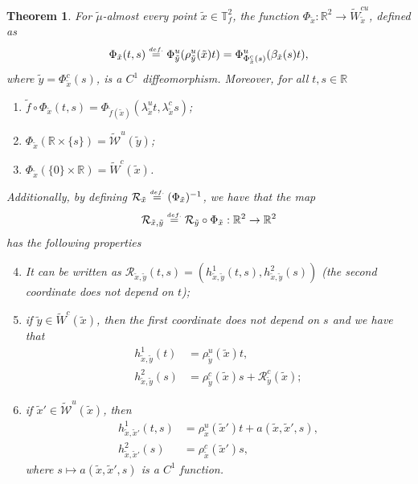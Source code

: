 \documentclass[a4paper,11pt,reqno]{amsart}
\def\tW{\widetilde W}
\newcommand{\R}{{\mathbb R}}
\newcommand{\cW}{{\mathcal W}}
\newcommand{\eqdef}{\stackrel{\scriptscriptstyle\textrm def.}{=}}
\newcommand{\tix}{\tilde{x}}
\newcommand{\w}{\widetilde{\cW}}
\newtheorem{theorem}{Theorem}[section]
\theoremstyle{definition}
\begin{document}
\begin{theorem}
    \label{teo:formanormal2}
    For $\tilde{\mu}$-almost every point $\tilde{x}\in \mathbb{T}^2_f$, the function $\Phi_{\tix}: \R^2 \to \tW^{cu}_{\tix}$, defined as
    \begin{equation}
        \label{eq:Phi}
        \Phi_{\tix}(t,s) \eqdef \Phi^u_{\tilde{y}}(\rho^u_{\tilde{y}}(\tix) t)= \Phi^u_{\Phi^c_{\tix}(s)}(\beta_{\tix}(s) t),
    \end{equation}
    where $\tilde{y} = \Phi^c_{\tix}(s)$, is a $C^1$ diffeomorphism. Moreover, for all $t,s \in \R$
    \begin{enumerate}
    \item $\tilde{f} \circ \Phi_{\tix}(t,s) = \Phi_{\tilde{f}(\tix)}(\lambda^u_{\tix}t,\lambda^c_{\tix}s)$;
        \item $\Phi_{\tix}(\R \times \{s\}) = \w^u(\tilde{y})$;
        \item $\Phi_{\tix}(\{0\} \times \R) = \tW^c(\tilde{x})$.
    \end{enumerate}
        Additionally, by defining $\mathcal{R}_{\tix} \eqdef (\Phi_{\tix})^{-1}$, we have that the map
        $$\mathcal{R}_{\tilde{x},\tilde{y}} \eqdef \mathcal{R}_{\tilde{y}} \circ \Phi_{\tilde{x}}: \R^2 \to \R^2$$ has the following properties
    \begin{enumerate}
    \setcounter{enumi}{3}
        \item It can be written as $\mathcal{R}_{\tilde{x},\tilde{y}}(t,s) = (h^1_{\tilde{x},\tilde{y}}(t,s), h^2_{\tilde{x},\tilde{y}}(s))$ (the second coordinate does not depend on $t$);
        \item if $\tilde{y} \in \tW^c(\tilde{x})$, then the first coordinate does not depend on $s$ and we have that
        \begin{align*}
            h^1_{\tilde{x},\tilde{y}}(t) &= \rho^u_{\tilde{y}}(\tilde{x})t,\\
            h^2_{\tilde{x},\tilde{y}}(s) &= \rho^c_{\tilde{y}}(\tilde{x})s + \mathcal{R}^c_{\tilde{y}}(\tilde{x});
        \end{align*}
        \item if $\tilde{x}' \in \w^u(\tilde{x})$, then 
        \begin{align*}
            h^1_{\tilde{x},\tilde{x}'}(t,s) &= \rho^u_{\tilde{x}}(\tilde{x}')t + a(\tilde{x}, \tilde{x}', s),\\
            h^2_{\tilde{x},\tilde{x}'}(s) &= \rho^c_{\tilde{x}}(\tilde{x}')s,
        \end{align*}
        where $s\mapsto a(\tilde{x}, \tilde{x}', s)$ is a $C^1$ function.
    \end{enumerate}
\end{theorem}
\end{document}
